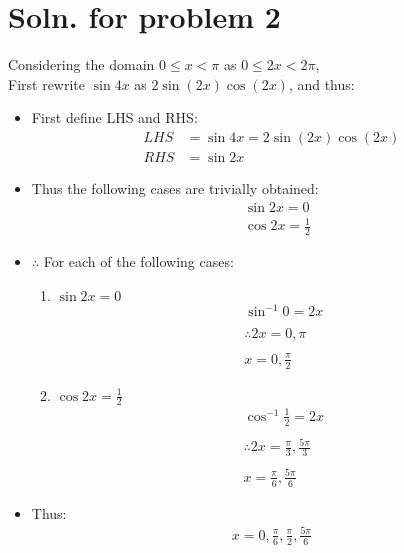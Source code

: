 \documentclass[12pt]{article}
\begin{document}
\newpage
\section*{Soln. for problem 2}

Considering the domain $0 \leq x<\pi$ as $0 \leq 2x<2\pi$, \\
First rewrite $\sin{4x}$ as $2\sin{(2x)}\cos{(2x)}$, and thus:
\begin{itemize}
	\item First define LHS and RHS:
	      \begin{align*}
		      LHS & = \sin{4x}=2\sin{(2x)}\cos{(2x)} \\
		      RHS & =\sin{2x}
	      \end{align*}

	\item Thus the following cases are trivially obtained:
	      \begin{align*}
		       & \sin{2x} = 0           \\
		       & \cos{2x} = \frac{1}{2}
	      \end{align*}

	\item $\therefore$ For each of the following cases:
	      \begin{enumerate}
		      \item $\displaystyle\sin{2x} = 0$
		            \begin{gather*}
			            \sin^{-1}{0} = 2x \\ \\
			            \therefore 2x = 0, \pi \\ \\
			            x = 0, \frac{\pi}{2}
		            \end{gather*}
		      \item $\displaystyle\cos{2x} = \displaystyle\frac{1}{2}$
		            \begin{gather*}
			            \cos^{-1}{\frac{1}{2}} = 2x \\ \\
			            \therefore 2x = \frac{\pi}{3}, \frac{5\pi}{3} \\ \\
			            x  = \frac{\pi}{6}, \frac{5\pi}{6}
		            \end{gather*}
	      \end{enumerate}

	\item Thus:
	      \begin{gather*}
		      x = 0, \frac{\pi}{6}, \frac{\pi}{2}, \frac{5\pi}{6}
	      \end{gather*}

\end{itemize}
\end{document}

